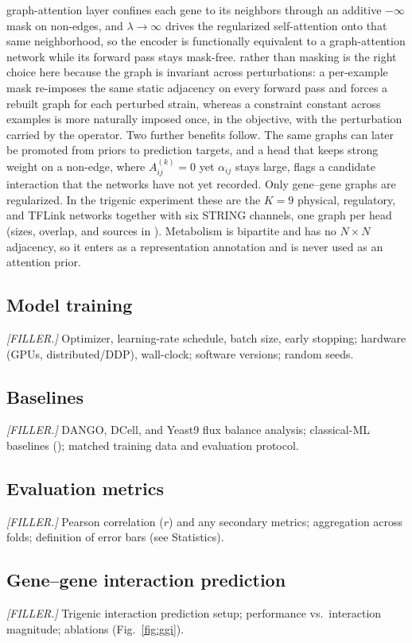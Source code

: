 graph-attention layer confines each gene to its neighbors through an additive $-\infty$
mask on non-edges, and $\lambda\!\to\!\infty$ drives the regularized self-attention onto that
same neighborhood, so the encoder is functionally equivalent to a graph-attention network
while its forward pass stays mask-free.  rather than masking is the right choice
here because the graph is invariant across perturbations: a per-example mask re-imposes the
same static adjacency on every forward pass and forces a rebuilt graph for each perturbed
strain, whereas a constraint constant across examples is more naturally imposed once, in the
objective, with the perturbation carried by the operator. Two further benefits follow. The same graphs can later be promoted from priors to
prediction targets, and a head that keeps strong weight on a non-edge, where
$A^{(k)}_{ij}=0$ yet $\alpha_{ij}$ stays large, flags a candidate interaction that the
networks have not yet recorded. Only gene--gene graphs are regularized. In the trigenic
experiment these are the $K=9$ physical, regulatory, and TFLink networks together with six
STRING channels, one graph per head (sizes, overlap, and sources in
). Metabolism is bipartite and has no $N\times N$
adjacency, so it enters as a representation annotation and is never used as an attention
prior.

\subsection*{Model training}
\textit{[FILLER.]} Optimizer, learning-rate schedule, batch size, early stopping;
hardware (GPUs, distributed/DDP), wall-clock; software versions; random seeds.

\subsection*{Baselines}
\textit{[FILLER.]} DANGO, DCell, and Yeast9 flux balance analysis; classical-ML baselines
(); matched training data and evaluation protocol.

\subsection*{Evaluation metrics}
\textit{[FILLER.]} Pearson correlation ($r$) and any secondary metrics; aggregation
across folds; definition of error bars (see Statistics).

\subsection*{Gene--gene interaction prediction}
\textit{[FILLER.]} Trigenic interaction prediction setup; performance vs.\ interaction
magnitude; ablations (Fig.~\ref{fig:ggi}).

